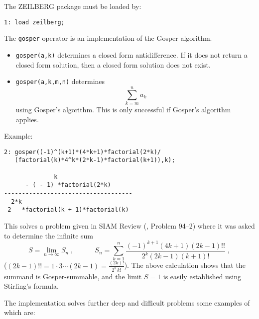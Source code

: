 The ZEILBERG package must be loaded by:

{\small
\begin{verbatim}
1: load zeilberg;
\end{verbatim}
}\noindent
The {\tt gosper} operator is an implementation of the Gosper algorithm.
\begin{itemize}
\item
{\tt gosper(a,k)} determines a closed
form antidifference. If it does not return a closed form solution, then
a closed form solution does not exist.
\item
{\tt gosper(a,k,m,n)} determines
\[
\sum_{k=m}^n a_k
\]
using Gosper's algorithm. This is only successful if Gosper's algorithm applies.
\end{itemize}

Example:

{\small
\begin{verbatim}
2: gosper((-1)^(k+1)*(4*k+1)*factorial(2*k)/
   (factorial(k)*4^k*(2*k-1)*factorial(k+1)),k);

              k
      - ( - 1) *factorial(2*k)
------------------------------------
  2*k
 2   *factorial(k + 1)*factorial(k)
\end{verbatim}
}\noindent
This solves a problem given in SIAM Review (\cite{SR}, Problem 94--2)
where it was asked to determine the infinite sum
\[
S=\lim_{n\rightarrow\infty} S_n
\;,
\quad\quad\quad
S_n=\sum_{k=1}^n
\frac{(-1)^{k+1}(4k+1)(2k-1)!!}{2^k(2k-1)(k+1)!}
\;,
\]
($(2k-1)!!=1\cdot 3 \cdots (2k-1)=\frac{(2k)!}{2^k\,k!}$).
The above calculation shows that the summand is Gosper-summable,
and the limit $S=1$ is easily established using Stirling's formula.

The implementation solves further deep and difficult problems some examples of
which are:%


